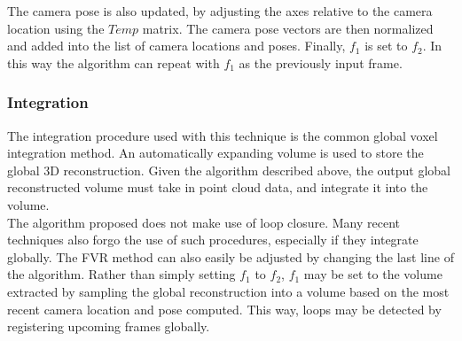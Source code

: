 The camera pose is also updated, by adjusting the axes relative to the camera location using the $Temp$ matrix. The camera pose vectors are then normalized and added into the list of camera locations and poses. Finally, $f_1$ is set to $f_2$. In this way the algorithm can repeat with $f_1$ as the previously input frame. \\  



\subsubsection{Integration}

The integration procedure used with this technique is the common global voxel integration method. An automatically expanding volume is used to store the global 3D reconstruction. Given the algorithm described above, the output global reconstructed volume must take in point cloud data, and integrate it into the volume. \\

The algorithm proposed does not make use of loop closure. Many recent techniques also forgo the use of such procedures, especially if they integrate globally. The FVR method can also easily be adjusted by changing the last line of the algorithm. Rather than simply setting $f_1$ to $f_2$, $f_1$ may be set to the volume extracted by sampling the global reconstruction into a volume based on the most recent camera location and pose computed. This way, loops may be detected by registering upcoming frames globally. \\
